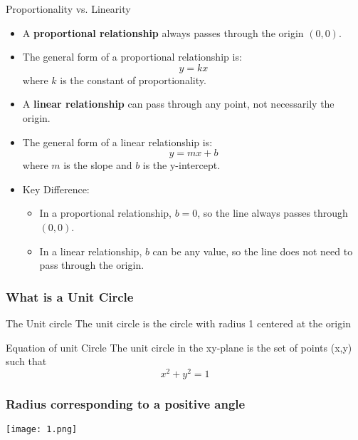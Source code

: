 \documentclass{beamer}
\begin{document}
\begin{frame}{Proportionality vs. Linearity}
    \begin{itemize}
        \item A \textbf{proportional relationship} always passes through the origin \((0, 0)\).
        \item The general form of a proportional relationship is:
        \[
        y = kx
        \]
        where \(k\) is the constant of proportionality.
        
        \item A \textbf{linear relationship} can pass through any point, not necessarily the origin.
        \item The general form of a linear relationship is:
        \[
        y = mx + b
        \]
        where \(m\) is the slope and \(b\) is the y-intercept.
        
        \item Key Difference:
        \begin{itemize}
            \item In a proportional relationship, \(b = 0\), so the line always passes through \((0, 0)\).
            \item In a linear relationship, \(b\) can be any value, so the line does not need to pass through the origin.
        \end{itemize}
    \end{itemize}
\end{frame}










\begin{frame}
\frametitle{What is a Unit Circle}
\begin{block}{The Unit circle}
    The unit circle is the circle with radius 1 centered at the origin 
\end{block}
\begin{block}{Equation of unit Circle}
    The unit circle in the xy-plane is the set of points (x,y) such that
    $$x^{2} + y^{2} = 1$$
    
\end{block}

\end{frame}

\begin{frame}
    \frametitle{Radius corresponding to a positive angle}
    \centering
    \texttt{[image: 1.png]}

\end{frame}
\end{document}

